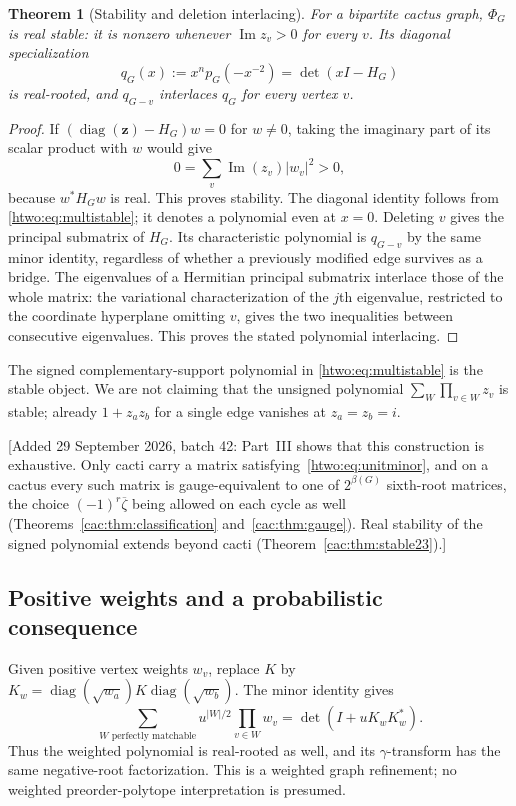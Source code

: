 \documentclass[11pt]{article}
\numberwithin{equation}{section}
\newtheorem{theorem}{Theorem}[section]
\theoremstyle{definition}
\newcommand{\diag}{\operatorname{diag}}
\begin{document}
\begin{theorem}[Stability and deletion interlacing]\label{htwo:thm:stability}
For a bipartite cactus graph, $\Phi_G$ is real stable: it is nonzero whenever
$\operatorname{Im}z_v>0$ for every $v$. Its diagonal specialization
\begin{equation}
 q_G(x):=x^n p_G(-x^{-2})=\det(xI-H_G)
 \label{htwo:eq:qG}
\end{equation}
is real-rooted, and $q_{G-v}$ interlaces $q_G$ for every vertex $v$.
\end{theorem}
\begin{proof}
If $(\diag(\mathbf z)-H_G)w=0$ for $w\ne0$, taking the imaginary part
of its scalar product with $w$ would give
\[
 0=\sum_v\operatorname{Im}(z_v)|w_v|^2>0,
\]
because $w^*H_Gw$ is real. This proves stability. The diagonal identity
follows from \eqref{htwo:eq:multistable}; it denotes a polynomial even at
$x=0$. Deleting $v$ gives the principal submatrix of $H_G$. Its
characteristic polynomial is $q_{G-v}$ by the same minor identity,
regardless of whether a previously modified edge survives as a bridge.
The eigenvalues of a Hermitian principal submatrix interlace those of the
whole matrix: the variational characterization of the $j$th eigenvalue,
restricted to the coordinate hyperplane omitting $v$, gives the two
inequalities between consecutive eigenvalues. This proves the stated
polynomial interlacing.
\end{proof}

The signed complementary-support polynomial in \eqref{htwo:eq:multistable}
is the stable object. We are not claiming that the unsigned polynomial
$\sum_W\prod_{v\in W}z_v$ is stable; already $1+z_az_b$ for a single edge
vanishes at $z_a=z_b=i$.

[Added 29 September 2026, batch 42: Part~III shows that this construction is
exhaustive. Only cacti carry a matrix satisfying~\eqref{htwo:eq:unitminor},
and on a cactus every such matrix is gauge-equivalent to one of
$2^{\beta(G)}$ sixth-root matrices, the choice $(-1)^r\overline\zeta$ being
allowed on each cycle as well (Theorems~\ref{cac:thm:classification}
and~\ref{cac:thm:gauge}). Real stability of the signed polynomial extends
beyond cacti (Theorem~\ref{cac:thm:stable23}).]

\subsection{Positive weights and a probabilistic consequence}

Given positive vertex weights $w_v$, replace $K$ by
$K_w=\diag(\sqrt{w_a})K\diag(\sqrt{w_b})$. The minor identity gives
\begin{equation}
 \sum_{W\text{ perfectly matchable}}u^{|W|/2}\prod_{v\in W}w_v
 =\det(I+uK_wK_w^*).
 \label{htwo:eq:weighted}
\end{equation}
Thus the weighted polynomial is real-rooted as well, and its
$\gamma$-transform has the same negative-root factorization. This is a
weighted graph refinement; no weighted preorder-polytope interpretation
is presumed.
\end{document}
